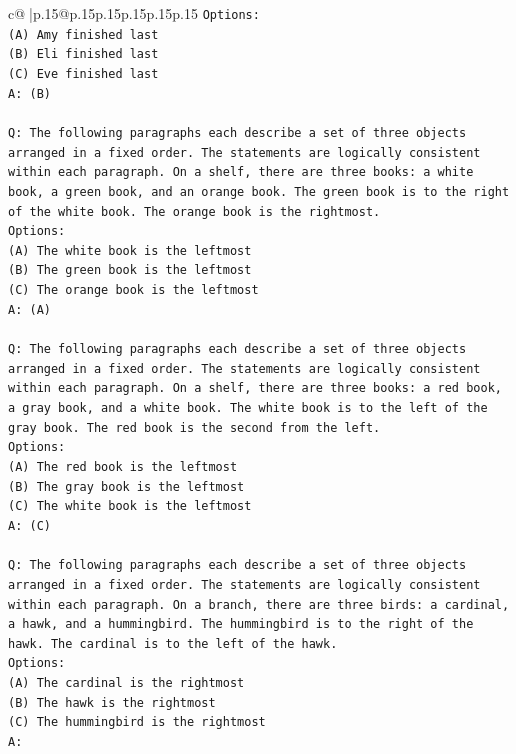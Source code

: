 \documentclass{article}
\begin{document}
{\begin{supertabular}{c@{$\;$}|p{.15\linewidth}@{}p{.15\linewidth}p{.15\linewidth}p{.15\linewidth}p{.15\linewidth}p{.15\linewidth}}
{{{\texttt{Options:} \\
\texttt{(A) Amy finished last} \\
\texttt{(B) Eli finished last} \\
\texttt{(C) Eve finished last} \\
\texttt{A: (B)} \\
\\ 
\texttt{Q: The following paragraphs each describe a set of three objects arranged in a fixed order. The statements are logically consistent within each paragraph. On a shelf, there are three books: a white book, a green book, and an orange book. The green book is to the right of the white book. The orange book is the rightmost.} \\
\texttt{Options:} \\
\texttt{(A) The white book is the leftmost} \\
\texttt{(B) The green book is the leftmost} \\
\texttt{(C) The orange book is the leftmost} \\
\texttt{A: (A)} \\
\\ 
\texttt{Q: The following paragraphs each describe a set of three objects arranged in a fixed order. The statements are logically consistent within each paragraph. On a shelf, there are three books: a red book, a gray book, and a white book. The white book is to the left of the gray book. The red book is the second from the left.} \\
\texttt{Options:} \\
\texttt{(A) The red book is the leftmost} \\
\texttt{(B) The gray book is the leftmost} \\
\texttt{(C) The white book is the leftmost} \\
\texttt{A: (C)} \\
\\ 
\texttt{Q: The following paragraphs each describe a set of three objects arranged in a fixed order. The statements are logically consistent within each paragraph. On a branch, there are three birds: a cardinal, a hawk, and a hummingbird. The hummingbird is to the right of the hawk. The cardinal is to the left of the hawk.} \\
\texttt{Options:} \\
\texttt{(A) The cardinal is the rightmost} \\
\texttt{(B) The hawk is the rightmost} \\
\texttt{(C) The hummingbird is the rightmost} \\
\texttt{A:} \\
            }
        }
    }
     \\ \\


\end{supertabular}}
\end{document}
